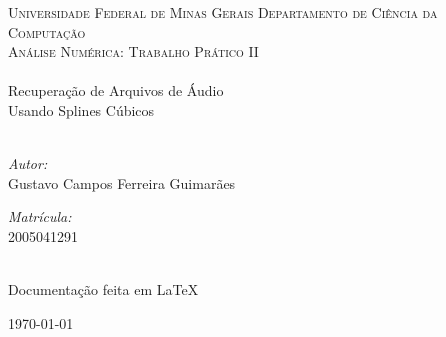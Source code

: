 \begin{titlepage}
\begin{center}

\textsc{Universidade Federal de Minas Gerais}
\textsc{Departamento de Ciência da Computação}\\[1.5cm]
\textsc{\Large Análise Numérica: Trabalho Prático II}\\[3.0cm] %


\HRule \\[1.5cm]
{\huge Recuperação de Arquivos de Áudio \\ Usando Splines Cúbicos}\\[1.5cm] %
\HRule \\[3.0cm]

\begin{minipage}{0.4\textwidth}
\begin{flushleft} \large
\emph{Autor:}\\
Gustavo Campos Ferreira Guimarães
\end{flushleft}
\end{minipage}
\begin{minipage}{0.4\textwidth}
\begin{flushright} \large
\emph{Matrícula:} \\
2005041291
\end{flushright}
\end{minipage}\\[1.5cm]
Documentação feita em \LaTeX

\vfill

{\large \today}

\end{center}

\end{titlepage}
